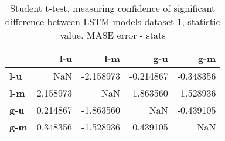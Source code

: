 \begin{table}[h]
\centering
\caption{Student t-test, measuring confidence of significant difference between LSTM models dataset 1, statistic value. MASE error - stats}
\label{table:ttest-stats-lstm-experiments-MASE-dataset-1}
\begin{tabular}{lrrrr}
\toprule
{} &       l-u &       l-m &       g-u &       g-m \\
\midrule
\textbf{l-u} &       NaN & -2.158973 & -0.214867 & -0.348356 \\
\textbf{l-m} &  2.158973 &       NaN &  1.863560 &  1.528936 \\
\textbf{g-u} &  0.214867 & -1.863560 &       NaN & -0.439105 \\
\textbf{g-m} &  0.348356 & -1.528936 &  0.439105 &       NaN \\
\bottomrule
\end{tabular}
\end{table}
